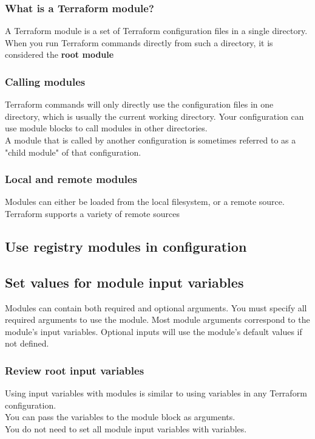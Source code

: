 \documentclass[12pt, letterpaper, twoside]{article}
\begin{document}
\subsubsection{What is a Terraform module?}
A Terraform module is a set of Terraform configuration files in a single directory.\\
When you run Terraform commands directly from such a directory, it is considered 
the \textbf{root module}

\subsubsection{Calling modules}
Terraform commands will only directly use the configuration files in one directory, 
which is usually the current working directory. Your configuration can use module 
blocks to call modules in other directories.\\
A module that is called by another configuration is sometimes referred to as a 
"child module" of that configuration.

\subsubsection{Local and remote modules}
Modules can either be loaded from the local filesystem, or a remote source.
Terraform supports a variety of remote sources

\subsection{Use registry modules in configuration}
\subsection{Set values for module input variables}
Modules can contain both required and optional arguments. You must specify 
all required arguments to use the module. Most module arguments correspond 
to the module's input variables. Optional inputs will use the module's default 
values if not defined.

\subsubsection{Review root input variables}
Using input variables with modules is similar to using variables in any 
Terraform configuration.\\
You can pass the variables to the module block as arguments.\\
You do not need to set all module input variables with variables.
\end{document}
